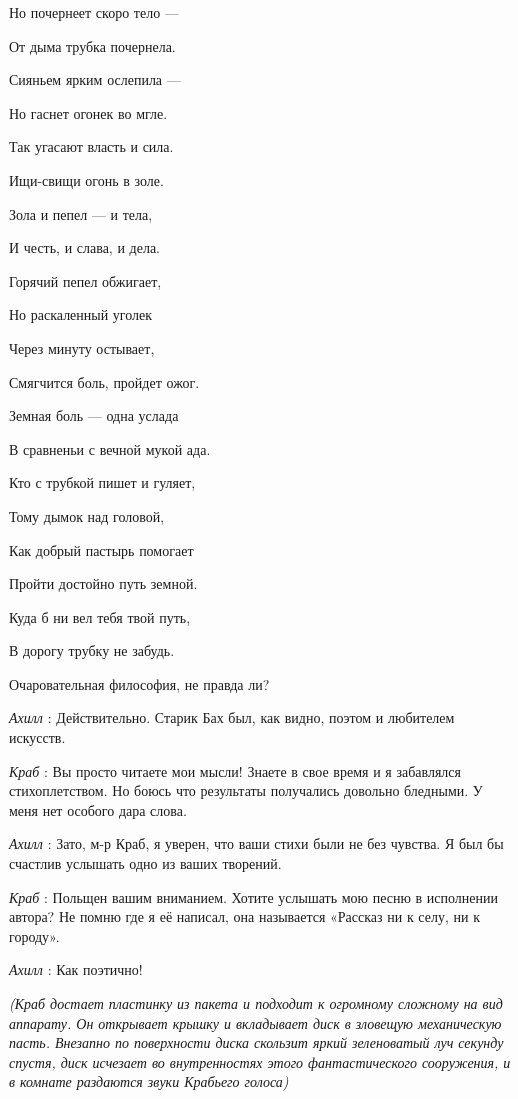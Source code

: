 \documentclass[../main.tex]{subfiles}
\begin{document}
\begin{dialogue}
Но почернеет скоро тело ---

От дыма трубка почернела.

Сияньем ярким ослепила ---

Но гаснет огонек во мгле.

Так угасают власть и сила.

Ищи-свищи огонь в золе.

Зола и пепел --- и тела,

И честь, и слава, и дела.

Горячий пепел обжигает,

Но раскаленный уголек

Через минуту остывает,

Смягчится боль, пройдет ожог.

Земная боль --- одна услада

В сравненьи с вечной мукой ада.

Кто с трубкой пишет и гуляет,

Тому дымок над головой,

Как добрый пастырь помогает

Пройти достойно путь земной.

Куда б ни вел тебя твой путь,

В дорогу трубку не забудь.

Очаровательная философия, не правда ли?

\emph{Ахилл} : Действительно. Старик Бах был, как видно, поэтом и любителем искусств.

\emph{Краб} : Вы просто читаете мои мысли! Знаете в свое время и я забавлялся стихоплетством. Но боюсь что результаты получались довольно бледными. У меня нет особого дара слова.

\emph{Ахилл} : Зато, м-р Краб, я уверен, что ваши стихи были не без чувства. Я был бы счастлив услышать одно из ваших творений.

\emph{Краб} : Польщен вашим вниманием. Хотите услышать мою песню в исполнении автора? Не помню где я её написал, она называется «Рассказ ни к селу, ни к городу».

\emph{Ахилл} : Как поэтично!

\emph{(Краб достает пластинку из пакета и подходит к огромному сложному на вид аппарату. Он открывает крышку и вкладывает диск в зловещую механическую пасть. Внезапно по поверхности диска скользит яркий зеленоватый луч секунду спустя, диск исчезает во внутренностях этого фантастического сооружения, и в комнате раздаются звуки Крабьего голоса)}


\end{dialogue}
\end{document}
